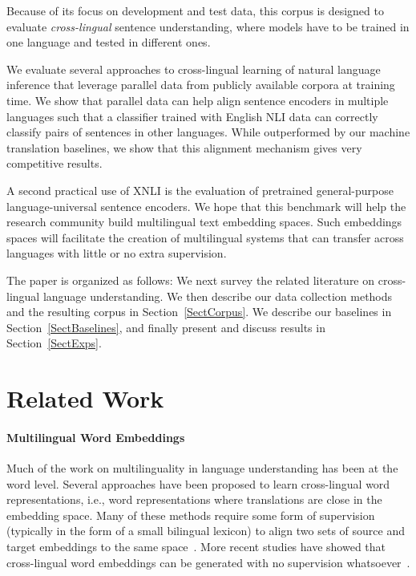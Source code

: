 \documentclass[11pt,a4paper]{article}
\begin{document}
Because of its focus on development and test data, this corpus is designed to evaluate \textit{cross-lingual} sentence understanding, where models have to be trained in one language and tested in different ones.

We evaluate several approaches to cross-lingual learning of natural language inference that leverage parallel data from publicly available corpora at training time. We show that parallel data can help align sentence encoders in multiple languages such that a classifier trained with English NLI data can correctly classify pairs of sentences in other languages. While outperformed by our machine translation baselines, we show that this alignment mechanism gives very competitive results.

A second practical use of XNLI is the evaluation of pretrained general-purpose language-universal sentence encoders.
We hope that this benchmark will help the research community build multilingual text embedding spaces. Such embeddings spaces will facilitate the creation of multilingual systems that can transfer across languages with little or no extra supervision.

The paper is organized as follows: We next survey the related literature on cross-lingual language understanding. We then describe our data collection methods and the resulting corpus in Section~\ref{SectCorpus}. We describe our baselines in Section~\ref{SectBaselines}, and finally present and discuss results in Section~\ref{SectExps}.


\section{Related Work}

\paragraph{Multilingual Word Embeddings}
Much of the work on multilinguality in language understanding has been at the word level. Several approaches have been proposed to learn cross-lingual word representations, i.e., word representations where translations are close in the embedding space. Many of these methods require some form of super\-vision (typically in the form of a small bi\-lingual lexicon) to align two sets of source and target embeddings to the same space~\cite{mikolov2013exploiting,Kocisky:2014:acl_biword,Faruqui:2014:eacl,ammar2016massively}. More recent studies have showed that cross-lingual word embeddings can be generated with no supervision whatsoever~\cite{Artetxe:2017:acl_mlword,Conneau:2018:iclr_muse}.
\end{document}
